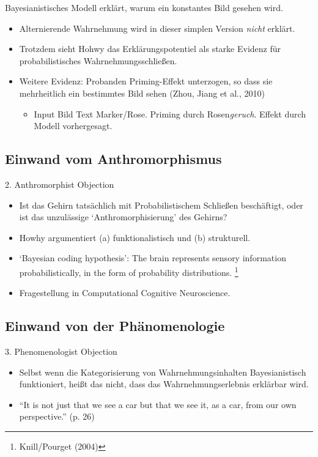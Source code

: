 \documentclass[11pt, handout]{beamer}
\begin{document}
\begin{frame}
  Bayesianistisches Modell erklärt, warum ein konstantes Bild gesehen wird.

  \begin{itemize}[<+->]
  \item Alternierende Wahrnehmung wird in dieser simplen Version \emph{nicht} erklärt.
  \item Trotzdem sieht Hohwy das Erklärungspotentiel als starke Evidenz für probabilistisches Wahrnehmungsschließen.
  \item Weitere Evidenz: Probanden Priming-Effekt unterzogen, so dass sie mehrheitlich ein bestimmtes Bild sehen (Zhou, Jiang et al., 2010)
    \begin{itemize}[<+->]
    \item Input Bild Text Marker/Rose. Priming durch Rosen\emph{geruch}. Effekt durch Modell vorhergesagt.
    \end{itemize}
  \end{itemize}
\end{frame}



\subsection{Einwand vom Anthromorphismus}

\begin{frame}
{\large 2. Anthromorphist Objection}
  \begin{itemize}[<+->]
  \item Ist das Gehirn tatsächlich mit Probabilistischem Schließen
    beschäftigt, oder ist das unzulässige `Anthromorphisierung' des
    Gehirns?
  \item Howhy argumentiert (a) funktionalistisch und (b) strukturell.
  \item `Bayesian coding hypothesis': The brain represents sensory
    information probabilistically, in the form of probability
    distributions. \footnote{Knill/Pourget (2004)}
  \item Fragestellung in Computational Cognitive Neuroscience.
  \end{itemize}
\end{frame}

\subsection{Einwand von der Phänomenologie}

\begin{frame}
  {\large 3. Phenomenologist Objection}
  \begin{itemize}[<+->]
  \item Selbst wenn die Kategorisierung von Wahrnehmungsinhalten Bayesianistisch funktioniert, heißt das nicht, dass das Wahrnehmungserlebnis erklärbar wird. 
  \item ``It is not just that we see a car but that we see it, as a car, from our own perspective.'' (p. 26)
  \end{itemize}

\end{frame}
\end{document}
